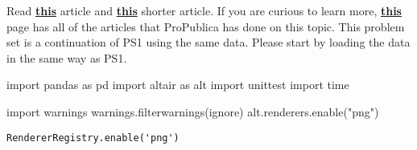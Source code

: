 \documentclass[
  letterpaper,
  DIV=11,
  numbers=noendperiod]{scrartcl}
\newenvironment{Shaded}{\begin{snugshade}}{\end{snugshade}}
\newcommand{\ImportTok}[1]{\textcolor[rgb]{0.00,0.46,0.62}{#1}}
\newcommand{\NormalTok}[1]{\textcolor[rgb]{0.00,0.23,0.31}{#1}}
\newcommand{\StringTok}[1]{\textcolor[rgb]{0.13,0.47,0.30}{#1}}
\begin{document}
Read
\textbf{\href{https://features.propublica.org/driven-into-debt/chicago-ticket-debt-bankruptcy/}{this}}
article and
\textbf{\href{https://www.propublica.org/article/chicago-vehicle-sticker-law-ticket-price-hike-black-drivers-debt}{this}}
shorter article. If you are curious to learn more,
\textbf{\href{https://www.propublica.org/series/driven-into-debt}{this}}
page has all of the articles that ProPublica has done on this topic.
This problem set is a continuation of PS1 using the same data. Please
start by loading the data in the same way as PS1.

\begin{Shaded}
\begin{Highlighting}[]
\ImportTok{import}\NormalTok{ pandas }\ImportTok{as}\NormalTok{ pd}
\ImportTok{import}\NormalTok{ altair }\ImportTok{as}\NormalTok{ alt}
\ImportTok{import}\NormalTok{ unittest}
\ImportTok{import}\NormalTok{ time}

\ImportTok{import}\NormalTok{ warnings }
\NormalTok{warnings.filterwarnings(}\StringTok{\textquotesingle{}ignore\textquotesingle{}}\NormalTok{)}
\NormalTok{alt.renderers.enable(}\StringTok{"png"}\NormalTok{)}
\end{Highlighting}
\end{Shaded}

\begin{verbatim}
RendererRegistry.enable('png')
\end{verbatim}
\end{document}
